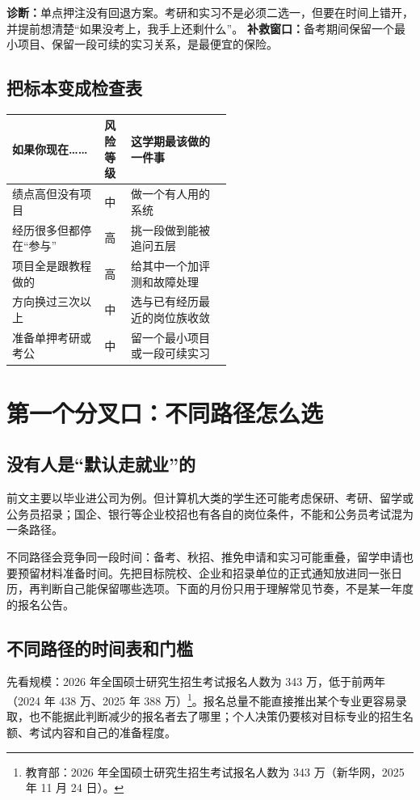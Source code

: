 \documentclass[UTF8,zihao=5,openany]{ctexbook}
\begin{document}
\textbf{诊断：}单点押注没有回退方案。考研和实习不是必须二选一，但要在时间上错开，并提前想清楚“如果没考上，我手上还剩什么”。
\textbf{补救窗口：}备考期间保留一个最小项目、保留一段可续的实习关系，是最便宜的保险。

\subsection{把标本变成检查表}
\begin{toolbox}
\begin{center}\small
\begin{tabularx}{0.92\linewidth}{p{0.42\linewidth}p{0.12\linewidth}Y}
\toprule
如果你现在…… & 风险等级 & 这学期最该做的一件事 \\
\midrule
绩点高但没有项目 & 中 & 做一个有人用的系统 \\
经历很多但都停在“参与” & 高 & 挑一段做到能被追问五层 \\
项目全是跟教程做的 & 高 & 给其中一个加评测和故障处理 \\
方向换过三次以上 & 中 & 选与已有经历最近的岗位族收敛 \\
准备单押考研或考公 & 中 & 留一个最小项目或一段可续实习 \\
\bottomrule
\end{tabularx}
\end{center}
\end{toolbox}


\section{第一个分叉口：不同路径怎么选}
\subsection{没有人是“默认走就业”的}
前文主要以毕业进公司为例。但计算机大类的学生还可能考虑保研、考研、留学或公务员招录；国企、银行等企业校招也有各自的岗位条件，不能和公务员考试混为一条路径。

不同路径会竞争同一段时间：备考、秋招、推免申请和实习可能重叠，留学申请也要预留材料准备时间。先把目标院校、企业和招录单位的正式通知放进同一张日历，再判断自己能保留哪些选项。下面的月份只用于理解常见节奏，不是某一年度的报名公告。

\subsection{不同路径的时间表和门槛}
先看规模：2026 年全国硕士研究生招生考试报名人数为 343 万，低于前两年（2024 年 438 万、2025 年 388 万）\footnote{教育部：2026 年全国硕士研究生招生考试报名人数为 343 万（新华网，2025 年 11 月 24 日）。}。报名总量不能直接推出某个专业更容易录取，也不能据此判断减少的报名者去了哪里；个人决策仍要核对目标专业的招生名额、考试内容和自己的准备程度。
\end{document}
